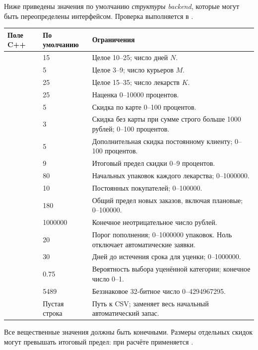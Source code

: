 Ниже приведены значения по умолчанию \emph{структуры backend}, которые могут
быть переопределены интерфейсом. Проверка выполняется в
.
{\small
\begin{longtable}{@{}L{0.30\textwidth}L{0.13\textwidth}L{0.49\textwidth}@{}}
\toprule
Поле C++ & По умолчанию & Ограничения \\
\midrule
\endhead
{} & 15 & Целое 10--25; число дней $N$. \\
 & 5 & Целое 3--9; число курьеров $M$. \\
 & 25 & Целое 15--35; число лекарств $K$. \\
 & 25 & Наценка 0--10000 процентов. \\
 & 5 & Скидка по карте 0--100 процентов. \\
 & 3 & Скидка без карты при сумме строго больше
1000 рублей; 0--100 процентов. \\
 & 5 & Дополнительная скидка постоянному клиенту;
0--100 процентов. \\
 & 9 & Итоговый предел скидки 0--9 процентов. \\
 & 80 & Начальных упаковок каждого лекарства; 0--1000000. \\
 & 10 & Постоянных покупателей; 0--100000. \\
 & 180 & Общий предел новых заказов, включая плановые;
0--100000. \\
 & 1000000 & Конечное неотрицательное число рублей. \\
 & 20 & Порог пополнения; 0--1000000 упаковок.
Ноль отключает автоматические заявки. \\
 & 30 & Дней до истечения срока для уценки; 0--1000000. \\
 & 0.75 & Вероятность выбора уценённой категории;
конечное число 0--1. \\
 & 5489 & Беззнаковое 32-битное число 0--4294967295. \\
 & Пустая строка & Путь к CSV; заменяет весь начальный
автоматический запас. \\
\bottomrule
\end{longtable}
}
Все вещественные значения должны быть конечными. Размеры отдельных скидок
могут превышать итоговый предел: при расчёте применяется
.

